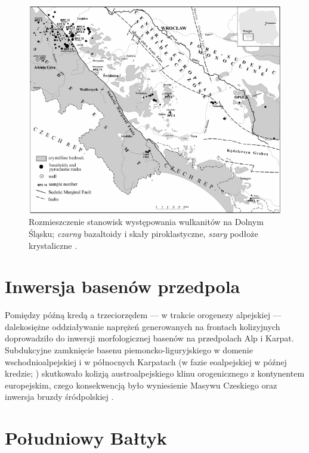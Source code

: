 \documentclass[11.5pt,twoside]{report}
\begin{document}
 \begin{figure}[h]
 	\centering
 	\includegraphics[width=0.7\linewidth]{../Termika/dslwulkanity}
 	\caption{Rozmieszczenie stanowisk występowania wulkanitów na Dolnym Śląsku; \textit{czarny} bazaltoidy i skały piroklastyczne, \textit{szary} podłoże krystaliczne \parencite{Badura.2005}.}
 	\label{badura}
 \end{figure}
 
 
 
 
 
 
 
  	\section{Inwersja basenów przedpola} 
  
 
  Pomiędzy pó\'{z}ną kredą a trzeciorzędem --- w trakcie orogenezy alpejskiej --- dalekosiężne oddziaływanie naprężeń generowanych na frontach kolizyjnych doprowadziło do inwersji morfologicznej basenów na przedpolach Alp i Karpat. Subdukcyjne zamknięcie basenu piemoncko-liguryjskiego w domenie wschodnioalpejskiej i w północnych Karpatach (w fazie eoalpejskiej w pó\'{z}nej kredzie; \cite{Lardeaux.1991}) skutkowało kolizją austroalpejskiego klinu orogenicznego z kontynentem europejskim, czego konsekwencją było wyniesienie Masywu Czeskiego oraz inwersja bruzdy śródpolskiej \parencite{Dezes.2004}.
  
  	\section{Południowy Bałtyk}
  	
\end{document}
